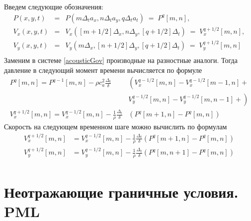 \documentclass[a4paper, fontsize=14pt]{article}
\begin{document}
Введем следующие обозначения:
\begin{eqnarray*}
P(x,y,t) & = & P(m\Delta_ta_x,n \Delta_ta_y,  q\Delta_ta_t) \;=\;
 P^q[m,n],\\
V_x(x,y,t) & = & 
  V_x\left([m+1/2]\Delta_x,n \Delta_y,  [q+1/2]\Delta_t\right)
  \;=\; V_x^{q+1/2}[m,n], \\
V_y(x,y,t) & = & 
  V_y\left(m\Delta_x,[n+1/2] \Delta_y,  [q+1/2]\Delta_t\right)
  \;=\; V_y^{q+1/2}[m,n] \\
\end{eqnarray*}
Заменим в системе \ref{acousticGov} производные на разностные аналоги. Тогда давление в следующий
момент времени вычисляется по формуле
\begin{align*}
P^q[m,n] = P^{q-1}[m,n] -
        \rho c_a^2 \frac{\Delta_t}{\delta}
	& \left( V_x^{q-1/2}[m,n]-V_x^{q-1/2}[m-1,n]+\mbox{}\right.\\
	& \left. V_y^{q-1/2}[m,n]-V_y^{q-1/2}[m,n-1]+\mbox{}\right)\\          
V_x^{q+1/2}[m,n] = V_x^{q-1/2}[m,n]
               -\frac{1}{\rho}\frac{\Delta_t}{\delta}
				& \left(P^q[m+1,n]-P^q[m,n]\right)
\end{align*}
Скорость на следующем временном шаге можно вычислить по формулам
\begin{align*}
	V_x^{q+1/2}[m,n] &= V_x^{q-1/2}[m,n]
               -\frac{1}{\rho}\frac{\Delta_t}{\delta}
                \left(P^q[m+1,n]-P^q[m,n]\right)\\
	V_y^{q+1/2}[m,n] &= V_y^{q-1/2}[m,n]
               -\frac{1}{\rho}\frac{\Delta_t}{\delta}
                \left(P^q[m,n+1]-P^q[m,n]\right)\\
\end{align*}

\cite{ufdtd}

\section{Неотражающие граничные условия. PML}
\end{document}
